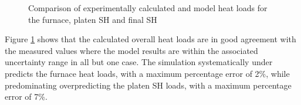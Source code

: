 \documentclass[review]{elsarticle}
\begin{document}
\begin{figure}[h!]
\centerline{
	}
\caption{Comparison of experimentally calculated and model heat loads for the furnace, platen SH and final SH}
\label{fig_heat_valid}
\end{figure}
\clearpage
Figure \ref{fig_heat_valid} shows that the calculated overall heat loads are in good agreement with the measured values where the model results are within the associated uncertainty range in all but one case. The simulation systematically under predicts the furnace heat loads, with a maximum percentage error of 2\%, while predominating overpredicting the platen SH loads, with a maximum percentage error of 7\%.\\
\end{document}
